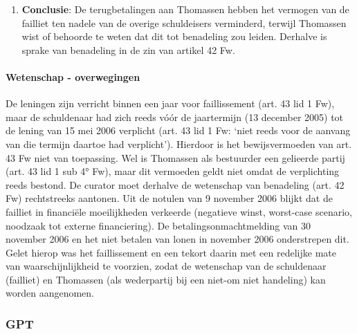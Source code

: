 \documentclass[
  dutch,
  a4paper,
]{article}
\providecommand{\tightlist}{%
  \setlength{\itemsep}{0pt}\setlength{\parskip}{0pt}}
\begin{document}
\begin{enumerate}
  \begin{itemize}
  \tightlist
  \item
    Er is geen aanwijzing dat de andere schuldeisers (zoals de fiscus, UWV, ABP of werknemers) zich niet op de terugbetaalde bedragen hadden kunnen verhalen. De bedragen waren immers liquide middelen die voor alle schuldeisers beschikbaar hadden moeten zijn.
  \end{itemize}
\item
  \textbf{Conclusie}:
  De terugbetalingen aan Thomassen hebben het vermogen van de failliet ten nadele van de overige schuldeisers verminderd, terwijl Thomassen wist of behoorde te weten dat dit tot benadeling zou leiden. Derhalve is sprake van benadeling in de zin van artikel 42 Fw.
\end{enumerate}

\paragraph{Wetenschap - overwegingen}\label{wetenschap---overwegingen-72}

De leningen zijn verricht binnen een jaar voor faillissement (art. 43 lid 1 Fw), maar de schuldenaar had zich reeds vóór de jaartermijn (13 december 2005) tot de lening van 15 mei 2006 verplicht (art. 43 lid 1 Fw: `niet reeds voor de aanvang van die termijn daartoe had verplicht'). Hierdoor is het bewijsvermoeden van art. 43 Fw niet van toepassing. Wel is Thomassen als bestuurder een gelieerde partij (art. 43 lid 1 sub 4° Fw), maar dit vermoeden geldt niet omdat de verplichting reeds bestond. De curator moet derhalve de wetenschap van benadeling (art. 42 Fw) rechtstreeks aantonen. Uit de notulen van 9 november 2006 blijkt dat de failliet in financiële moeilijkheden verkeerde (negatieve winst, worst-case scenario, noodzaak tot externe financiering). De betalingsonmachtmelding van 30 november 2006 en het niet betalen van lonen in november 2006 onderstrepen dit. Gelet hierop was het faillissement en een tekort daarin met een redelijke mate van waarschijnlijkheid te voorzien, zodat de wetenschap van de schuldenaar (failliet) en Thomassen (als wederpartij bij een niet-om niet handeling) kan worden aangenomen.

\newpage


\subsubsection{GPT}\label{gpt-24}
\end{document}
